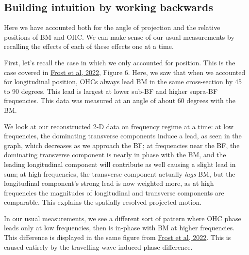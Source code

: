 \documentclass{article}
\begin{document}
\subsection{Building intuition by working backwards}
\par{Here we have accounted both for the angle of projection and the relative positions of BM and OHC. We can make sense of our usual measurements by recalling the effects of each of these effects one at a time.}
\par{First, let's recall the case in which we only accounted for position. This is the case covered in \href{https://asa.scitation.org/doi/full/10.1121/10.0009576}{Frost et al, 2022}, Figure 6. Here, we saw that when we accounted for longitudinal position, OHCs always lead BM in the same cross-section by 45 to 90 degrees. This lead is largest at lower sub-BF and higher supra-BF frequencies. This data was measured at an angle of about 60 degrees with the BM.}
\par{We look at our reconstructed 2-D data on frequency regime at a time: at low frequencies, the dominating transverse components induce a lead, as seen in the graph, which decreases as we approach the BF; at frequencies near the BF, the dominating transverse component is nearly in phase with the BM, and the leading longitudinal component will contribute as well causing a slight lead in sum; at high frequencies, the transverse component actually \textit{lags} BM, but the longitudinal component's strong lead is now weighted more, as at high frequencies the magnitudes of longitudinal and transverse components are comparable. This explains the spatially resolved projected motion.}
\par{In our usual measurements, we see a different sort of pattern where OHC phase leads only at low frequencies, then is in-phase with BM at higher frequencies. This difference is displayed in the same figure from \href{https://asa.scitation.org/doi/full/10.1121/10.0009576}{Frost et al, 2022}. This is caused entirely by the travelling wave-induced phase difference.}
\end{document}
